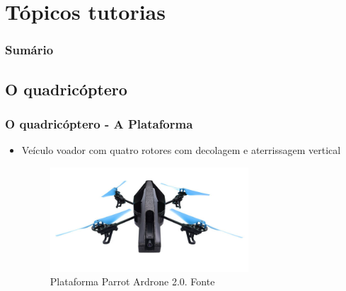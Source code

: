 \documentclass{beamer}
\begin{document}

\section{Tópicos tutorias}

\begin{frame}
	\frametitle{Sumário}
	\tableofcontents[currentsection]
\end{frame}

\subsection*{O quadricóptero}
\begin{frame}
  	
	\frametitle{O quadricóptero - A Plataforma}
	
	\begin{itemize}
	
	\item Veículo voador com quatro rotores com decolagem e aterrissagem vertical \cite{Salih2010}
		
	\begin{figure}
		\centering
		\includegraphics[keepaspectratio = true,
		width=0.7\textwidth]{img/parrot_drone.jpg}
		\caption{Plataforma Parrot Ardrone 2.0. Fonte \cite{ardrone}}
		\label{fig:quad}
	\end{figure}
		
	\end{itemize}
	
\end{frame}
\end{document}
